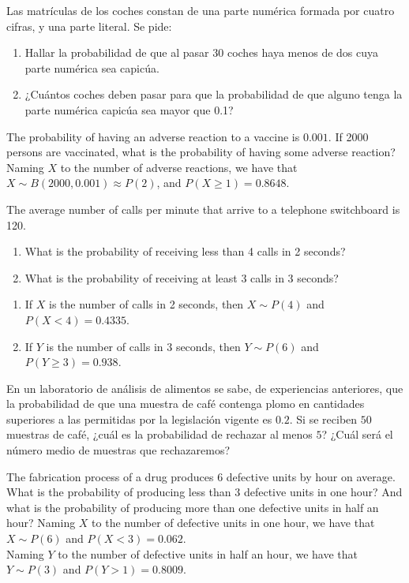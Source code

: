 {Las matrículas de los coches constan de una parte numérica formada por cuatro cifras, y una parte literal. Se pide:

\begin{enumerate}
\item  Hallar la probabilidad de que al pasar 30 coches haya menos de dos cuya parte numérica sea capicúa.
\item  ¿Cuántos coches deben pasar para que la probabilidad de que alguno tenga la parte numérica capicúa sea mayor
que 0.1?
\end{enumerate}
}
{}
{}


{The probability of having an adverse reaction to a vaccine is $0.001$. 
If 2000 persons are vaccinated, what is the probability of having some adverse reaction?
}
{Naming $X$ to the number of adverse reactions, we have that $X\sim B(2000,0.001)\approx P(2)$, and $P(X\geq 1)=0.8648$.
}
{}


{The average number of calls per minute that arrive to a telephone switchboard is 120. 
\begin{enumerate}
\item What is the probability of receiving less than 4 calls in 2 seconds?
\item What is the probability of receiving at least 3 calls in 3 seconds?
\end{enumerate}
}
{
\begin{enumerate}
\item If $X$ is the number of calls in 2 seconds, then $X\sim P(4)$ and $P(X<4)=0.4335$.
\item If $Y$ is the number of calls in 3 seconds, then $Y\sim P(6)$ and $P(Y\geq 3)=0.938$.
\end{enumerate}
}
{}


{En un laboratorio de análisis de alimentos se sabe, de experiencias anteriores, que la probabilidad de que una muestra de café contenga plomo en cantidades superiores a las permitidas por la legislación vigente es $0.2$. Si se reciben $50$ muestras de café, ¿cuál es la probabilidad de rechazar al menos $5$?
¿Cuál será el número medio de muestras que rechazaremos?
}
{}
{}


{The fabrication process of a drug produces 6 defective units by hour on average.
What is the probability of producing less than 3 defective units in one hour?
And what is the probability of producing more than one defective units in half an hour?}
{Naming $X$ to the number of defective units in one hour, we have that $X\sim P(6)$ and $P(X<3)=0.062$.\\
Naming $Y$ to the number of defective units in half an hour, we have that $Y\sim P(3)$ and $P(Y>1)=0.8009$.}
{}


